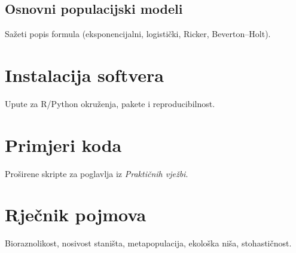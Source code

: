 \documentclass[11pt,oneside]{book}
\newcommand{\R}{\textsf{R}}
\newcommand{\Python}{\textsf{Python}}
\begin{document}
	\section{Osnovni populacijski modeli}
	Sažeti popis formula (eksponencijalni, logistički, Ricker, Beverton--Holt).
	
	\chapter{Instalacija softvera}
	Upute za \R/\Python{} okruženja, pakete i reproducibilnost.
	
	\chapter{Primjeri koda}
	Proširene skripte za poglavlja iz \emph{Praktičnih vježbi}.
	
	\chapter{Rječnik pojmova}
	Bioraznolikost, nosivost staništa, metapopulacija, ekološka niša, stohastičnost.
	
	\backmatter
	\printbibliography
	
\end{document}
